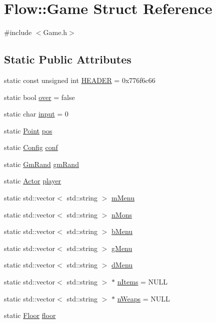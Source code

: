 \hypertarget{struct_flow_1_1_game}{}\section{Flow\+:\+:Game Struct Reference}
\label{struct_flow_1_1_game}


{\ttfamily \#include $<$Game.\+h$>$}

\subsection*{Static Public Attributes}
\begin{DoxyCompactItemize}
\item 
static const unsigned int \hyperlink{struct_flow_1_1_game_a25fd62c3ab045d2c4e94920359a83a88}{H\+E\+A\+D\+ER} = 0x776f6c66
\item 
static bool \hyperlink{struct_flow_1_1_game_afcbe054fdbcd4eeefabd75ce3ffbe9dd}{over} = false
\item 
static char \hyperlink{struct_flow_1_1_game_a4438db527125bb587f7d2a55ea0c4cec}{input} = 0
\item 
static \hyperlink{struct_flow_1_1_point}{Point} \hyperlink{struct_flow_1_1_game_ac624f04e5b1f64bcc126455cebd657a0}{pos}
\item 
static \hyperlink{struct_flow_1_1_config}{Config} \hyperlink{struct_flow_1_1_game_a1a4562b85733e7edeca321043e08a4a1}{conf}
\item 
static \hyperlink{class_flow_1_1_gm_rand}{Gm\+Rand} \hyperlink{struct_flow_1_1_game_a2472db93858dc5cd513379328fe1bf5b}{gm\+Rand}
\item 
static \hyperlink{class_flow_1_1_actor}{Actor} \hyperlink{struct_flow_1_1_game_a82056349f2d164e104b496d0adf59e61}{player}
\item 
static std\+::vector$<$ std\+::string $>$ \hyperlink{struct_flow_1_1_game_a02e4c98f7e94142c26a0d45068abfbf3}{m\+Menu}
\item 
static std\+::vector$<$ std\+::string $>$ \hyperlink{struct_flow_1_1_game_a02a99aab36d412ff3fa39f33d9d8f75c}{n\+Mons}
\item 
static std\+::vector$<$ std\+::string $>$ \hyperlink{struct_flow_1_1_game_ab8ad15809dbf8afe3c2676e8cb0d2aa2}{b\+Menu}
\item 
static std\+::vector$<$ std\+::string $>$ \hyperlink{struct_flow_1_1_game_abf561ad69faaf819c7b2f2cc62dfae5e}{g\+Menu}
\item 
static std\+::vector$<$ std\+::string $>$ \hyperlink{struct_flow_1_1_game_a2d8ee4def710e9846bf636ecfcf6a5da}{d\+Menu}
\item 
static std\+::vector$<$ std\+::string $>$ $\ast$ \hyperlink{struct_flow_1_1_game_a722e065ecf907576f0b569a242464861}{n\+Items} = N\+U\+LL
\item 
static std\+::vector$<$ std\+::string $>$ $\ast$ \hyperlink{struct_flow_1_1_game_ae8f060eae77f91be1be9d54b58e4cb2b}{n\+Weaps} = N\+U\+LL
\item 
static \hyperlink{class_flow_1_1_floor}{Floor} \hyperlink{struct_flow_1_1_game_adcb177a0b639e9a3919ad9360b89c217}{floor}
\end{DoxyCompactItemize}


